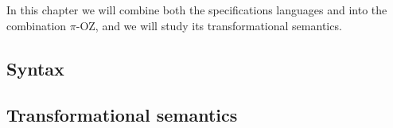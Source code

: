 In this chapter we will combine both the specifications languages \oz{} and \picalc{} into the combination $\pi$-OZ, and we will study its transformational semantics.
\subsection{Syntax}
\label{sec_comp_oz_pi_syntax}


\subsection{Transformational semantics}
\label{sec_comp_oz_pi_transformational_semantics}


